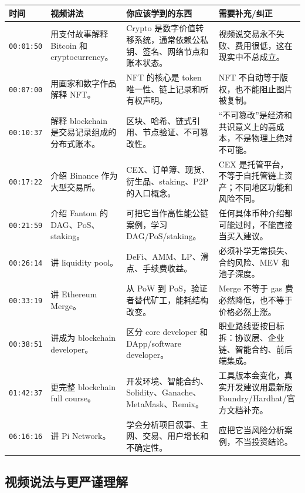 \documentclass[UTF8,11pt]{ctexart}
\newcommand{\timestamp}[1]{\textcolor{blue!50!black}{\texttt{#1}}}
\begin{document}
\begin{longtable}{>{\raggedright\arraybackslash}p{2.2cm}>{\raggedright\arraybackslash}p{3.4cm}>{\raggedright\arraybackslash}p{4.2cm}>{\raggedright\arraybackslash}p{4.4cm}}
\toprule
\textbf{时间} & \textbf{视频讲法} & \textbf{你应该学到的东西} & \textbf{需要补充/纠正} \\
\midrule
\endhead
\timestamp{00:01:50} & 用支付故事解释 Bitcoin 和 cryptocurrency。 & Crypto 是数字价值转移系统，通常依赖公私钥、签名、网络节点和账本状态。 & 视频说交易永不失败、费用很低，这在现实中不总成立。 \\
\timestamp{00:07:00} & 用画家和数字作品解释 NFT。 & NFT 的核心是 token 唯一性、链上记录和所有权声明。 & NFT 不自动等于版权，也不能阻止图片被复制。 \\
\timestamp{00:10:37} & 解释 blockchain 是交易记录组成的分布式账本。 & 区块、哈希、链式引用、节点验证、不可篡改性。 & “不可篡改”是经济和共识意义上的高成本，不是物理上绝对不可能。 \\
\timestamp{00:17:22} & 介绍 Binance 作为大型交易所。 & CEX、订单簿、现货、衍生品、staking、P2P 的入口概念。 & CEX 是托管平台，不等于自托管链上资产；不同地区功能和风险不同。 \\
\timestamp{00:21:59} & 介绍 Fantom 的 DAG、PoS、staking。 & 可把它当作高性能公链案例，学习 DAG/PoS/staking。 & 任何具体币种介绍都可能过时，不能直接当买入建议。 \\
\timestamp{00:26:14} & 讲 liquidity pool。 & DeFi、AMM、LP、滑点、手续费收益。 & 必须补学无常损失、合约风险、MEV 和池子深度。 \\
\timestamp{00:33:19} & 讲 Ethereum Merge。 & 从 PoW 到 PoS，验证者替代矿工，能耗结构改变。 & Merge 不等于 gas 费必然降低，也不等于价格必然上涨。 \\
\timestamp{00:38:51} & 讲成为 blockchain developer。 & 区分 core developer 和 DApp/software developer。 & 职业路线要按目标拆：协议层、企业链、智能合约、前后端集成。 \\
\timestamp{01:42:37} & 更完整 blockchain full course。 & 开发环境、智能合约、Solidity、Ganache、MetaMask、Remix。 & 工具版本会变化，真实开发建议用最新版 Foundry/Hardhat/官方文档补充。 \\
\timestamp{06:16:16} & 讲 Pi Network。 & 学会分析项目叙事、主网、交易、用户增长和不确定性。 & 应把它当风险分析案例，不当投资结论。 \\
\bottomrule
\end{longtable}

\subsection{视频说法与更严谨理解}
\end{document}
